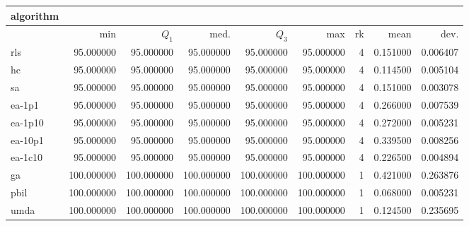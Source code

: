 \begin{tabular}{@{}l*{5}{>{{}}N{3}{0}}>{{}}N{2}{0}N{1}{3}N{1}{3}@{}}
\toprule
{algorithm} &  &  \\
\midrule
& {min} & {$Q_1$} & {med.} & {$Q_3$} & {max} & {rk} & {mean} & {dev.} \\
\midrule
rls & 95.000000 & 95.000000 & 95.000000 & 95.000000 & 95.000000 & 4 & 0.151000 & 0.006407 \\
 hc & 95.000000 & 95.000000 & 95.000000 & 95.000000 & 95.000000 & 4 & 0.114500 & 0.005104 \\
 sa & 95.000000 & 95.000000 & 95.000000 & 95.000000 & 95.000000 & 4 & 0.151000 & 0.003078 \\
 ea-1p1 & 95.000000 & 95.000000 & 95.000000 & 95.000000 & 95.000000 & 4 & 0.266000 & 0.007539 \\
 ea-1p10 & 95.000000 & 95.000000 & 95.000000 & 95.000000 & 95.000000 & 4 & 0.272000 & 0.005231 \\
 ea-10p1 & 95.000000 & 95.000000 & 95.000000 & 95.000000 & 95.000000 & 4 & 0.339500 & 0.008256 \\
 ea-1c10 & 95.000000 & 95.000000 & 95.000000 & 95.000000 & 95.000000 & 4 & 0.226500 & 0.004894 \\
 ga & {\color{blue}} 100.000000 & {\color{blue}} 100.000000 & {\color{blue}} 100.000000 & {\color{blue}} 100.000000 & {\color{blue}} 100.000000 & 1 & 0.421000 & 0.263876 \\
 pbil & {\color{blue}} 100.000000 & {\color{blue}} 100.000000 & {\color{blue}} 100.000000 & {\color{blue}} 100.000000 & {\color{blue}} 100.000000 & 1 & 0.068000 & 0.005231 \\
 umda & {\color{blue}} 100.000000 & {\color{blue}} 100.000000 & {\color{blue}} 100.000000 & {\color{blue}} 100.000000 & {\color{blue}} 100.000000 & 1 & 0.124500 & 0.235695 \\
 \bottomrule
\end{tabular}

